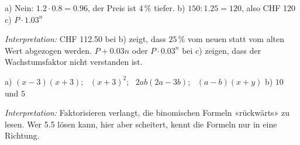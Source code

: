 \documentclass[11pt]{exam}
\newcommand{\aufgabe}[1]{%
  \needspace{8\baselineskip}%
  \renewcommand{\questionlabel}{\textbf{#1}}%
  \question}
\newcommand{\geteilt}{\mathbin{:}}
\newcommand{\kaestchen}{\fbox{\rule{0pt}{1.1em}\hspace{1.6em}}}
\newcommand{\raum}[1]{\ifprintanswers\else\fillwithgrid{#1}\fi}
\newcommand{\diagnose}[1]{\par\smallskip\textit{Interpretation:} #1}
\begin{document}
\begin{questions}
\begin{solution}
  a) Nein: $1.2 \cdot 0.8 = 0.96$, der Preis ist $4\,\%$ tiefer. \quad
  b) $150 \geteilt 1.25 = 120$, also CHF 120 \quad
  c) $P \cdot 1.03^n$
  \diagnose{CHF 112.50 bei b) zeigt, dass $25\,\%$ vom neuen statt vom alten
  Wert abgezogen werden. $P + 0.03n$ oder $P \cdot 0.03^n$ bei c) zeigen, dass
  der Wachstumsfaktor nicht verstanden ist.}
\end{solution}
\raum{4cm}

\aufgabe{5.6}
\begin{solution}
  a) $(x - 3)(x + 3)$; \ $(x + 3)^2$; \ $2ab(2a - 3b)$; \ $(a - b)(x + y)$
  \quad b) $10$ und $5$
  \diagnose{Faktorisieren verlangt, die binomischen Formeln «rückwärts» zu
  lesen. Wer 5.5 lösen kann, hier aber scheitert, kennt die Formeln nur in eine
  Richtung.}
\end{solution}
\raum{3.5cm}


\end{questions}
\end{document}
